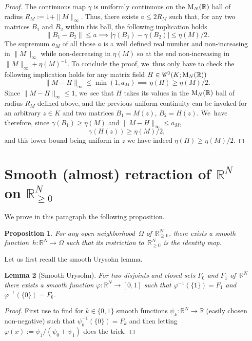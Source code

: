 \documentclass[10pt]{amsart}
\newtheorem{prop}{Proposition}[section]
\newtheorem{lem}[prop]{Lemma}
\theoremstyle{definition}
\newcommand\R{\mathbb{R}}
\let\ffi\varphi
\begin{document}
\begin{proof}
The continuous map $\gamma$ is uniformly continuous on the $\textnormal{M}_N(\R)$ ball of radius $R_M:=1+\|M\|_\infty$. Thus, there exists $a\leq 2 R_M$ such that, for any two matrices $B_1$ and $B_2$ within this ball, the following implication holds
\[
\| B_1 - B_2 \| \leq a \implies |\gamma(B_1)-\gamma(B_2)|\leq \eta(M)/2.
\]
The supremum $a_M$ of all those $a$ is a well defined real number and non-increasing in $\|M\|_\infty$ while non-decreasing in $\eta(M)$ so at the end non-increasing in $\|M\|_\infty+\eta(M)^{-1}$. To conclude the proof, we~thus only have to check the following implication holds for any matrix field $H\in\mathscr{C}^0(K;\textnormal{M}_N(\R))$
\[
\| M -H\|_\infty \leq \min(1,a_M) \implies \eta(H)\geq \eta(M)/2.
\]
Since $\|M-H\|_\infty \leq 1$, we~see that $H$ takes its values in the $\textnormal{M}_N(\R)$ ball of radius $R_M$ defined above, and the previous uniform continuity can be invoked for an arbitrary $z\in K$ and two matrices $B_1=M(z)$, $B_2=H(z)$. We~have therefore, since $\gamma(B_1)\geq \eta(M)$ and $\|M-H\|_\infty\leq a_M$,
\[
\gamma(H(z)) \geq \eta(M)/2,
\]
and this lower-bound being uniform in $z$ we have indeed $\eta(H)\geq \eta(M)/2$.
\end{proof}
\section{Smooth (almost) retraction of \texorpdfstring{$\R^N$ on $\R_{\geq 0}^N$}{RN}}\label{app:retract}
We prove in this paragraph the following proposition.
\begin{prop}\label{prop:quadrant}
For any open neighborhood~$\Omega$ of~$\R_{\geq 0}^N$, there exists a smooth function~${h:\R^N\to \Omega}$ such that its restriction to~$\R_{\geq 0}^N$ is the identity map.
\end{prop}

Let us first recall the smooth Urysohn lemma.
\begin{lem}[Smooth Urysohn]\label{lem:ury}
For two disjoints and closed sets $F_0$ and $F_1$ of~$\R^N$ there exists a smooth function $\ffi:\R^N\to[0,1]$ such that $\ffi^{-1}(\{1\}) = F_1$ and $\ffi^{-1}(\{0\})=F_0$.
\end{lem}
\begin{proof}
First use \cite[Th.\,2.29]{lee} to find for $k\!\in\!\{0,1\}$ smooth functions \hbox{$\psi_k:\R^N\to \R$} (easily chosen non-negative) such that $\psi^{-1}_k(\{0\})=F_k$ and then letting $\ffi(x):=\psi_1/(\psi_0+\psi_1)$ does the trick.
\end{proof}
\end{document}
